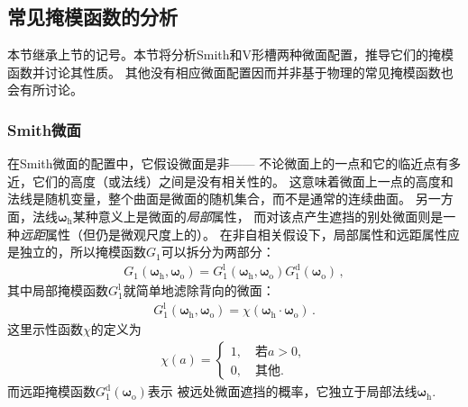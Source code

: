 \subsection{常见掩模函数的分析}\label{sub:常见掩模函数的分析}
本节继承上节的记号。本节将分析Smith和V形槽两种微面配置，推导它们的掩模函数并讨论其性质。
其他没有相应微面配置因而并非基于物理的常见掩模函数也会有所讨论。

\subsubsection*{Smith微面}
在Smith微面的配置中，它假设微面是非——
不论微面上的一点和它的临近点有多近，它们的高度（或法线）之间是没有相关性的。
这意味着微面上一点的高度和法线是随机变量，整个曲面是微面的随机集合，而不是通常的连续曲面。
另一方面，法线${\bm\omega}_{\mathrm{h}}$某种意义上是微面的\emph{局部}属性，
而对该点产生遮挡的别处微面则是一种\emph{远距}属性（但仍是微观尺度上的）。
在非自相关假设下，局部属性和远距属性应是独立的，所以掩模函数$G_1$可以拆分为两部分：
\begin{align}\label{eq:08ex01-SeparableMaskingFunction}
    G_1({\bm\omega}_{\mathrm{h}},{\bm\omega}_{\mathrm{o}})
    =G_1^{\mathrm{l}}({\bm\omega}_{\mathrm{h}},{\bm\omega}_{\mathrm{o}})
    G_1^{\mathrm{d}}({\bm\omega}_{\mathrm{o}})\, ,
\end{align}
其中局部掩模函数$G_1^{\mathrm{l}}$就简单地滤除背向的微面：
\begin{align}\label{eq:08ex01-LocalMaskFunction}
    G_1^{\mathrm{l}}({\bm\omega}_{\mathrm{h}},{\bm\omega}_{\mathrm{o}})
    =\chi({\bm\omega}_{\mathrm{h}}\cdot{\bm\omega}_{\mathrm{o}})\, .
\end{align}
这里示性函数$\chi$的定义为
\begin{align}
    \chi(a)=\left\{\begin{array}{l}
        1,\quad\text{若}a>0, \\
        0,\quad\text{其他}.
    \end{array}\right.
\end{align}
而远距掩模函数$G_1^{\mathrm{d}}({\bm\omega}_{\mathrm{o}})$表示
被远处微面遮挡的概率，它独立于局部法线${\bm\omega}_{\mathrm{h}}$.

